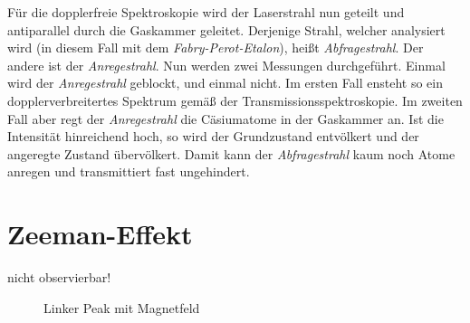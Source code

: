 \documentclass[../bericht.tex]{subfiles}
\begin{document}
        F\"ur die dopplerfreie Spektroskopie wird der Laserstrahl nun geteilt und antiparallel durch die Gaskammer geleitet. Derjenige Strahl, welcher analysiert wird (in diesem Fall mit dem \textit{Fabry-Perot-Etalon}), heißt \textit{Abfragestrahl}. Der andere ist der \textit{Anregestrahl}. Nun werden zwei Messungen durchgef\"uhrt. Einmal wird der \textit{Anregestrahl} geblockt, und einmal nicht. Im ersten Fall ensteht so ein dopplerverbreitertes Spektrum gem\"aß der Transmissionsspektroskopie. Im zweiten Fall aber regt der \textit{Anregestrahl} die C\"asiumatome in der Gaskammer an. Ist die Intensit\"at hinreichend hoch, so wird der Grundzustand entv\"olkert und der angeregte Zustand \"uberv\"olkert. Damit kann der \textit{Abfragestrahl} kaum noch Atome anregen und transmittiert fast ungehindert.


    \section{Zeeman-Effekt}
    \label{sec:zeeman-effekt}

      nicht observierbar!




      \begin{figure}[tb]
                \centering
                \caption{Linker Peak mit Magnetfeld}
                \label{fig:dopplerfreies-spektrum-links}
      \end{figure}
\end{document}
